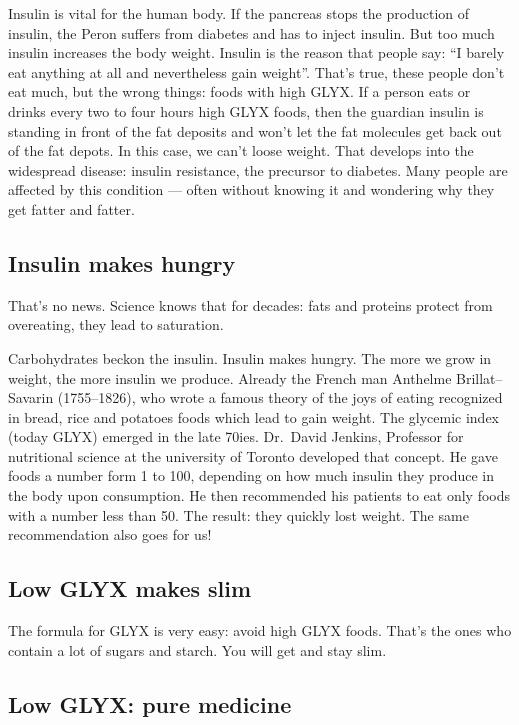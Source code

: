 \documentclass[../main.tex]{subfiles}
\begin{document}
Insulin is vital for the human body. If the pancreas stops the production of insulin,
the Peron suffers from diabetes and has to inject insulin.
But too much insulin increases the body weight.
Insulin is the reason that people say: ``I barely eat anything at all and nevertheless gain weight''.
That's true, these people don't eat much, but the wrong things: foods with high GLYX.
If a person eats or drinks every two to four hours high GLYX foods, then the guardian insulin is standing in front of the fat deposits and won't let 
the fat molecules get back out of the fat depots. In this case, we can't loose weight.
That develops into the widespread disease: insulin resistance, the precursor to diabetes.
Many people are affected by this condition --- often without knowing it and wondering why they get fatter and fatter.

\subsection{Insulin makes hungry}

That's no news. Science knows that for decades: fats and proteins protect from overeating, they lead to saturation.

Carbohydrates beckon the insulin. Insulin makes hungry. The more we grow in weight, the more insulin we produce.
Already the French man Anthelme Brillat--Savarin (1755--1826), who wrote a famous theory of the joys of eating recognized in bread, rice and potatoes
foods which lead to gain weight.
The glycemic index (today GLYX) emerged in the late 70ies.
Dr.~David Jenkins, Professor for nutritional science at the university of Toronto developed that concept.
He gave foods a number form 1 to 100, depending on how much insulin they produce in the body upon consumption.
He then recommended his patients to eat only foods with a number less than 50. The result: they quickly lost weight.
The same recommendation also goes for us!

\subsection{Low GLYX makes slim}

The formula for GLYX is very easy: avoid high GLYX foods. That's the ones who contain a lot of sugars and starch.
You will get and stay slim.

\subsection{Low GLYX: pure medicine}
\end{document}
